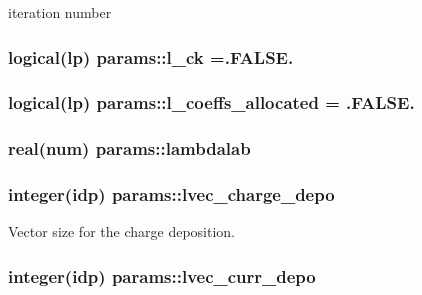 iteration number 

\subsubsection[{\texorpdfstring{l\+\_\+ck}{l_ck}}]{\setlength{\rightskip}{0pt plus 5cm}logical(lp) params\+::l\+\_\+ck =.F\+A\+L\+S\+E.}\hypertarget{namespaceparams_a15761ff2e6c2554f53e451a6a7d3b5e5}{}\label{namespaceparams_a15761ff2e6c2554f53e451a6a7d3b5e5}
\subsubsection[{\texorpdfstring{l\+\_\+coeffs\+\_\+allocated}{l_coeffs_allocated}}]{\setlength{\rightskip}{0pt plus 5cm}logical(lp) params\+::l\+\_\+coeffs\+\_\+allocated = .F\+A\+L\+S\+E.}\hypertarget{namespaceparams_a4b1f8ff700f30016bbf830bc640b49da}{}\label{namespaceparams_a4b1f8ff700f30016bbf830bc640b49da}
\subsubsection[{\texorpdfstring{lambdalab}{lambdalab}}]{\setlength{\rightskip}{0pt plus 5cm}real(num) params\+::lambdalab}\hypertarget{namespaceparams_a24b22ed48dbf0d3d0f582e6db7d40a76}{}\label{namespaceparams_a24b22ed48dbf0d3d0f582e6db7d40a76}
\subsubsection[{\texorpdfstring{lvec\+\_\+charge\+\_\+depo}{lvec_charge_depo}}]{\setlength{\rightskip}{0pt plus 5cm}integer(idp) params\+::lvec\+\_\+charge\+\_\+depo}\hypertarget{namespaceparams_a73dceeb78f9f0abe2d39ba48e2aee2d9}{}\label{namespaceparams_a73dceeb78f9f0abe2d39ba48e2aee2d9}


Vector size for the charge deposition. 

\subsubsection[{\texorpdfstring{lvec\+\_\+curr\+\_\+depo}{lvec_curr_depo}}]{\setlength{\rightskip}{0pt plus 5cm}integer(idp) params\+::lvec\+\_\+curr\+\_\+depo}\hypertarget{namespaceparams_aedb04c2dd01619937eaad2ce0a2626a5}{}\label{namespaceparams_aedb04c2dd01619937eaad2ce0a2626a5}


